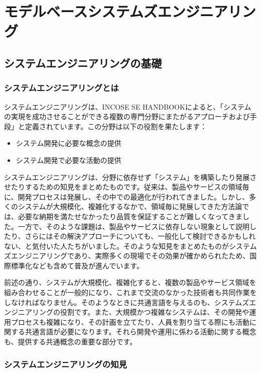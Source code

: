 \chapter{モデルベースシステムズエンジニアリング}
\label{chap4}

\section{システムエンジニアリングの基礎}

\subsection{システムエンジニアリングとは}

システムエンジニアリングは、INCOSE SE HANDBOOKによると、「システムの実現を成功させることができる複数の専門分野にまたがるアプローチおよび手段」と定義されています。この分野は以下の役割を果たします：

\begin{itemize}
    \item システム開発に必要な概念の提供
    \item システム開発で必要な活動の提供
\end{itemize}

システムエンジニアリングは、分野に依存せず「システム」を構築したり発展させたりするための知見をまとめたものです。従来は、製品やサービスの領域毎に、開発プロセスは発展し、その中での最適化が行われてきました。しかし、多くのシステムが大規模化、複雑化するなかで、領域毎に発展してきた方法論では、必要な納期を満たせなかったり品質を保証することが難しくなってきました。一方で、そのような課題は、製品やサービスに依存しない現象として説明したり、さらにはその解決アプローチについても、一般化して検討できるかもしれない、と気付いた人たちがいました。そのような知見をまとめたものがシステムズエンジニアリングであり、実際多くの現場でその効果が確かめられたため、国際標準化なども含めて普及が進んでいます。

前述の通り、システムが大規模化、複雑化すると、複数の製品やサービス領域を組み合わせることが一般的になり、これまで交流のなかった技術者も共同作業をしなければなりません。そのようなときに共通言語を与えるのも、システムズエンジニアリングの役割です。また、大規模かつ複雑なシステムは、その開発や運用プロセスも複雑になり、その計画を立てたり、人員を割り当てる際にも活動に関する共通言語が必要になります。それら開発や運用に係わる活動に関する概念も、提供する共通概念の重要な部分です。

\subsection{システムエンジニアリングの知見}

